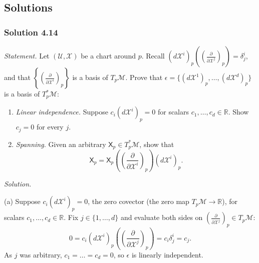 \documentclass[11pt]{article}
\begin{document}
\subsection*{Solutions}

\subsubsection*{Solution 4.14}

\noindent\textit{Statement.} Let $(\mathcal U,\mathcal X)$ be a chart
around $p$. Recall $(d\mathcal X^i)_p\!\left(\left(\frac{\partial}{\partial
\mathcal X^j}\right)_p\right)=\delta^i_j$, and that
$\left\{\left(\frac{\partial}{\partial\mathcal X^i}\right)_p\right\}$ is a
basis of $T_p\mathcal M$. Prove that $\epsilon=\{(d\mathcal
X^1)_p,\dots,(d\mathcal X^d)_p\}$ is a basis of $T_p^*\mathcal M$:
\begin{enumerate}[label=(\alph*)]
  \item \emph{Linear independence.} Suppose $c_i(d\mathcal
  X^i)_p=0$ for scalars $c_1,\dots,c_d\in\mathbb R$. Show $c_j=0$ for every
  $j$.
  \item \emph{Spanning.} Given an arbitrary $\mathsf X_p\in T_p^*\mathcal
  M$, show that
  \[
  \mathsf X_p = \mathsf X_p\!\left(\left(\frac{\partial}
  {\partial\mathcal X^i}\right)_p\right)(d\mathcal X^i)_p.
  \]
\end{enumerate}

\medskip
\noindent\textit{Solution.}

(a) Suppose $c_i(d\mathcal X^i)_p=0$, the zero covector (the
zero map $T_p\mathcal M\to\mathbb R$), for scalars $c_1,\dots,c_d\in\mathbb
R$. Fix $j\in\{1,\dots,d\}$ and evaluate both sides on
$\left(\frac{\partial}{\partial\mathcal X^j}\right)_p\in T_p\mathcal M$:
\[
0 = c_i(d\mathcal X^i)_p\!\left(\left(\frac{\partial}{\partial
\mathcal X^j}\right)_p\right) = c_i\delta^i_j = c_j.
\]
As $j$ was arbitrary, $c_1=\dots=c_d=0$, so $\epsilon$ is linearly
independent.
\end{document}
